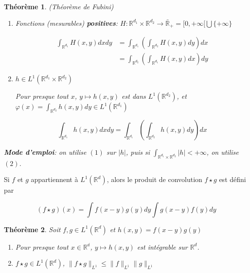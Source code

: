 \documentclass[10pt,a4paper,oneside]{article}
\newtheorem{theoreme}{Théorème}
\newenvironment{definition}[1][Definition]{\begin{trivlist}
\item[\hskip \labelsep {\bfseries #1}]}{\end{trivlist}}
\begin{document}
\begin{itemize}
\item
\begin{theoreme}
(Théorème de Fubini)

\begin{enumerate}
\item
Fonctions (mesurables) \textbf{positives}: $H: \mathbb{R}^{d_1} \times \mathbb{R}^{d_2} \to \bar{\mathbb{R}}_+ = [0,+\infty[ \bigcup \{+\infty\}$

\begin{align*}
\int_{\mathbb{R}^{d_1}} H(x,y) dx dy &= \int_{\mathbb{R}^{d_1}} (\int_{\mathbb{R}^{d_2}} H(x,y) dy) dx \\
&= \int_{\mathbb{R}^{d_2}} (\int_{\mathbb{R}^{d_1}} H(x,y) dx) dy
\end{align*}

\item
$h \in L^1(\mathbb{R}^{d_1} \times \mathbb{R}^{d_2})$

Pour presque tout $x$, $y \mapsto h(x,y)$ est dans $L^1(\mathbb{R}^{d_2})$, et $\varphi(x) = \int_{\mathbb{R}^{d_2}} h(x,y) dy \in L^1(\mathbb{R}^{d_1})$

\[ \int_{\mathbb{R}^{d_1}} h(x,y) dx dy = \int_{\mathbb{R}^{d_1}} (\int_{\mathbb{R}^{d_2}} h(x,y) dy) dx \]

\end{enumerate}

\textbf{Mode d'emploi}: on utilise $(1)$ sur $|h|$, puis si $\int_{\mathbb{R}^{d_1} \times \mathbb{R}^{d_2}} |h| < +\infty$, on utilise $(2)$.
\end{theoreme}

\item
\begin{definition}
Si $f$ et $g$ appartiennent à $L^1(\mathbb{R}^d)$, alors le produit de convolution $f \star g$ est défini par

\[ (f \star g)(x) = \int f(x - y)g(y) dy \int g(x - y) f(y) dy \]
\end{definition}

\item
\begin{theoreme}
Soit $f,g \in L^1(\mathbb{R}^d)$ et $h(x,y)= f(x - y)g(y)$

\begin{enumerate}
\item
Pour presque tout $x \in \mathbb{R^d}$, $y \mapsto h(x,y)$ est intégrable sur $\mathbb{R}^d$.

\item
$f \star g \in L^1(\mathbb{R}^d)$, $\| f \star g \|_{L^1} \leq \| f \|_{L^1} \| g \|_{L^1}$
\end{enumerate}
\end{theoreme}


\end{itemize}
\end{document}
